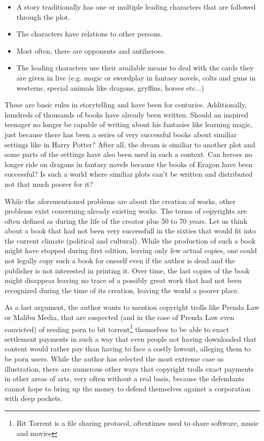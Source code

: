 \documentclass[a4paper]{report}
\begin{document}
\begin{itemize}
	\item A story traditionally has one or multiple leading characters that are followed through the plot.
	\item The characters have relations to other persons.
	\item Most often, there are opponents and antiheroes.
	\item The leading characters use their available means to deal with the cards they are given in live (e.g. magic or swordplay in fantasy novels, colts and guns in westerns, special animals like dragons, gryffins, horses etc...)
\end{itemize} 
These are basic rules in storytelling and have been for centuries. Additionally, hundreds of thousands of books have already been written. Should an inspired teenager no longer be capable of writing about his fantasies like learning magic, just because there has been a series of very successful books about similiar settings like in Harry Potter? After all, the dream is similiar to another plot and some parts of the settings have also been used in such a context. Can heroes no longer ride on dragons in fantasy novels because the books of Eragon have been successful? Is such a world where similiar plots can't be written and distributed not that much poorer for it?

While the aforementioned problems are about the creation of works, other problems exist concerning already existing works. The terms of copyrights are often defined as during the life of the creator plus 50 to 70 years. Let us think about a book that had not been very successfull in the sixties that would fit into the current climate (political and cultural). While the production of such a book might have stopped during first edition, leaving only few actual copies, one could not legally copy such a book for oneself even if the author is dead and the publisher is not interested in printing it. Over time, the last copies of the book might disappear leaving no trace of a possibly great work that had not been recognized during the time of its creation, leaving the world a poorer place.

As a last argument, the author wants to mention copyright trolls like Prenda Law or Malibu Media, that are suspected (and in the case of Prenda Law even convicted) of seeding porn to bit torrent\footnote{Bit Torrent is a file sharing protocol, oftentimes used to share software, music and movies} themselves to be able to exact settlement payments in such a way that even people not having downloaded that content would rather pay than having to face a costly lawsuit, alleging them to be porn users. While the author has selected the most extreme case as illustration, there are numerous other ways that copyright trolls exact payments in other areas of arts, very often without a real basis, because the defendants cannot hope to bring up the money to defend themselves against a corporation with deep pockets.
\end{document}
